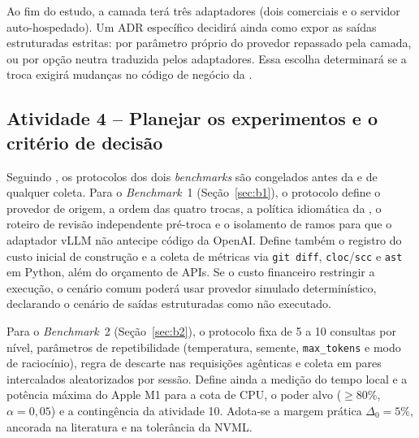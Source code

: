 Ao fim do estudo, a camada terá três adaptadores (dois comerciais e o servidor
auto-hospedado). Um ADR específico decidirá ainda como expor as saídas
estruturadas estritas: por parâmetro próprio do provedor repassado pela camada,
ou por opção neutra traduzida pelos adaptadores. Essa escolha determinará se a
troca exigirá mudanças no código de negócio da \versaoH.

\subsection{Atividade 4 -- Planejar os experimentos e o critério de decisão}
\label{subsec:at-planejamento}

Seguindo , os protocolos dos dois \textit{benchmarks} são
congelados antes da \versaoD{} e de qualquer coleta. Para o \textit{Benchmark}~1
(Seção~\ref{sec:b1}), o protocolo define o provedor de origem, a ordem das
quatro trocas, a política idiomática da \versaoD{}, o roteiro de revisão
independente pré-troca e o isolamento de ramos para que o adaptador vLLM não
antecipe código da OpenAI. Define também o registro do custo inicial de construção e a coleta de métricas
via \texttt{git diff}, \texttt{cloc}/\texttt{scc} e \texttt{ast} em Python, além
do orçamento de APIs. Se o custo financeiro restringir a execução, o cenário
comum poderá usar provedor simulado determinístico, declarando o cenário de
saídas estruturadas como não executado.

Para o \textit{Benchmark}~2 (Seção~\ref{sec:b2}), o protocolo fixa de 5 a 10
consultas por nível, parâmetros de repetibilidade (temperatura, semente,
\texttt{max\_tokens} e modo de raciocínio), regra de descarte nas requisições
agênticas e coleta em pares intercalados aleatorizados por sessão. Define ainda
a medição do tempo local e a potência máxima do Apple M1 para a cota de CPU, o
poder alvo ($\ge 80\%$, $\alpha = 0{,}05$) e a contingência da atividade 10.
Adota-se a margem prática $\Delta_0 = 5\%$, ancorada na literatura
\cite{xiao2025,matinpour2026} e na tolerância da NVML.

